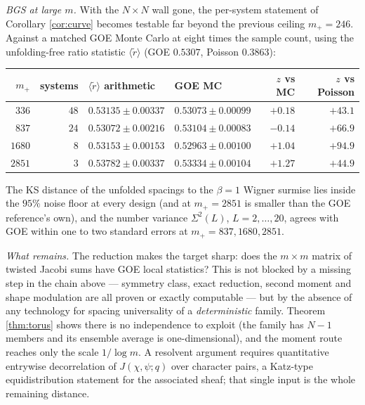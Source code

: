 \emph{BGS at large $m$.}  With the $N\times N$ wall gone, the per-system
statement of Corollary \ref{cor:curve} becomes testable far beyond the previous
ceiling $m_+=246$.  Against a matched GOE Monte Carlo at eight times the sample
count, using the unfolding-free ratio statistic $\langle\tilde r\rangle$
(GOE $0.5307$, Poisson $0.3863$):

\begin{center}\small
\begin{tabular}{rrllrr}
\toprule
$m_+$ & systems & $\langle\tilde r\rangle$ arithmetic & GOE MC & $z$ vs MC & $z$ vs Poisson\\
\midrule
$336$ & $48$ & $0.53135\pm0.00337$ & $0.53073\pm0.00099$ & $+0.18$ & $+43.1$\\
$837$ & $24$ & $0.53072\pm0.00216$ & $0.53104\pm0.00083$ & $-0.14$ & $+66.9$\\
$1680$ & $8$ & $0.53153\pm0.00153$ & $0.52963\pm0.00100$ & $+1.04$ & $+94.9$\\
$2851$ & $3$ & $0.53782\pm0.00337$ & $0.53334\pm0.00104$ & $+1.27$ & $+44.9$\\
\bottomrule
\end{tabular}
\end{center}

The KS distance of the unfolded spacings to the $\beta=1$ Wigner surmise lies
inside the $95\%$ noise floor at every design (and at $m_+=2851$ is smaller than
the GOE reference's own), and the number variance $\Sigma^2(L)$, $L=2,\dots,20$,
agrees with GOE within one to two standard errors at $m_+=837,1680,2851$.

\emph{What remains.}  The reduction makes the target sharp: does the $m\times m$
matrix of twisted Jacobi sums have GOE local statistics?  This is not blocked by
a missing step in the chain above --- symmetry class, exact reduction, second
moment and shape modulation are all proven or exactly computable --- but by the
absence of any technology for spacing universality of a \emph{deterministic}
family.  Theorem \ref{thm:torus} shows there is no independence to exploit (the
family has $N-1$ members and its ensemble average is one-dimensional), and the
moment route reaches only the scale $1/\log m$.  A resolvent argument requires
quantitative entrywise decorrelation of $J(\chi,\psi;q)$ over character pairs, a
Katz-type equidistribution statement for the associated sheaf; that single input
is the whole remaining distance.

